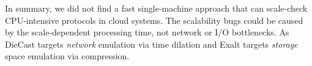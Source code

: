 
In summary, we did not find a fast single-machine approach that can scale-check
CPU-intensive protocols in cloud systems.
%
The scalability bugs could be caused by the scale-dependent processing time, not
network or I/O bottlenecks.  As DieCast targets {\em network} emulation via time
dilation and Exalt targets {\em storage} space emulation via compression. 


